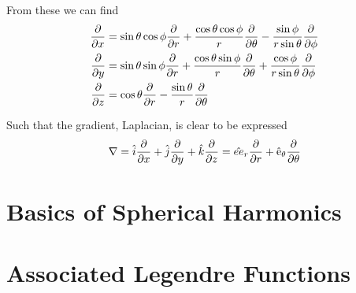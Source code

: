 From these we can find 
\begin{align}
    \frac{\partial }{\partial x} & = \sin \theta \cos \phi \frac{\partial }{\partial r} + \frac{\cos \theta \cos \phi}{r} \frac{\partial }{\partial \theta} - \frac{\sin \phi}{r \sin \theta} \frac{\partial }{\partial \phi} \\
    \frac{\partial }{\partial y} & = \sin \theta \sin \phi \frac{\partial }{\partial r} + \frac{\cos \theta \sin \phi}{r} \frac{\partial }{\partial \theta} + \frac{\cos \phi}{r \sin \theta} \frac{\partial }{\partial \phi} \\
    \frac{\partial }{\partial z} & = \cos \theta \frac{\partial }{\partial r} - \frac{\sin \theta}{r} \frac{\partial }{\partial \theta}
\end{align}

Such that the gradient, Laplacian, is clear to be expressed 
\begin{align}
    \nabla = \hat i \frac{\partial }{\partial x} + \hat j \frac{\partial }{\partial y} + \hat k \frac{\partial }{\partial z} = \hat{ee}_r \frac{\partial }{\partial r} + \hat{\mathrm{e}}_ \theta \frac{\partial }{\partial \theta}
\end{align}
\section{Basics of Spherical Harmonics}


\section{Associated Legendre Functions} \label{sec:AssociatedLegendreFunctions}





